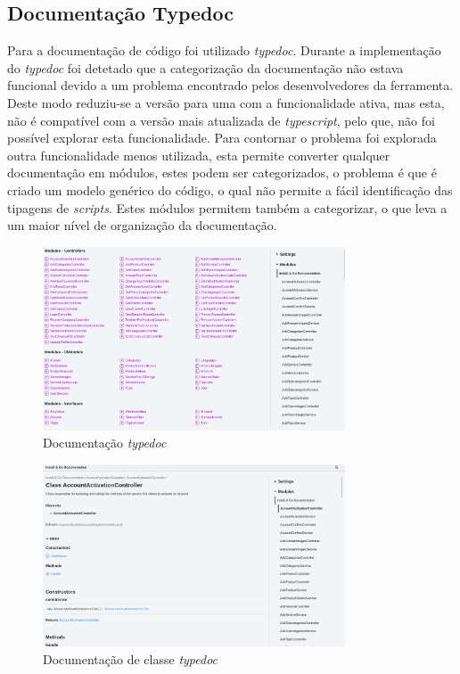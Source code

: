 \subsection{Documentação Typedoc}
Para a documentação de código foi utilizado \textit{typedoc}. Durante a implementação do \textit{typedoc} foi detetado que a categorização da documentação não estava funcional devido a um problema encontrado pelos desenvolvedores da ferramenta. Deste modo reduziu-se a versão para uma com a funcionalidade ativa, mas esta, não é compatível com a versão mais atualizada de \textit{typescript}, pelo que, não foi possível explorar esta funcionalidade. Para contornar o problema foi explorada outra funcionalidade menos utilizada, esta permite converter qualquer documentação em módulos, estes podem ser categorizados, o problema é que é criado um modelo genérico do código, o qual não permite a fácil identificação das tipagens de \textit{scripts}. Estes módulos permitem também a categorizar, o que leva a um maior nível de organização da documentação.

\begin{figure}[htb]
  \centering
  \includegraphics[width=0.8\textwidth]{images/implementacao/api/docs.png}
  \caption{Documentação \textit{typedoc}}
  \label{type_doc}
\end{figure}

\begin{figure}[htb]
  \centering
  \includegraphics[width=0.8\textwidth]{images/implementacao/api/docs_det.png}
  \caption{Documentação de classe \textit{typedoc}}
  \label{type_doc_det}
\end{figure}

